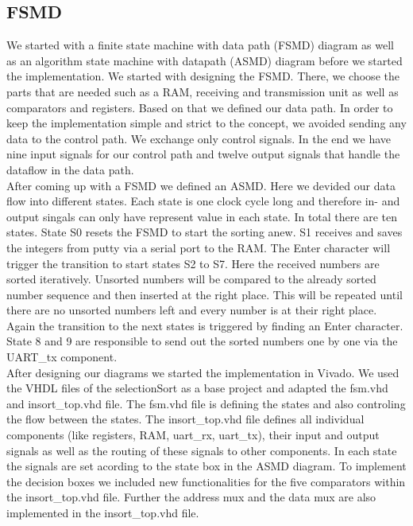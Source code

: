 \documentclass[conference]{IEEEtran}
\begin{document}
\subsection{FSMD}
We started with a finite state machine with data path (FSMD) diagram as well as an algorithm state machine with datapath (ASMD) diagram before we started the implementation. We started with designing the FSMD. There, we choose the parts that are needed such as a RAM, receiving and transmission unit as well as comparators and registers. Based on that we defined our data path. In order to keep the implementation simple and strict to the concept, we avoided sending any data to the control path. We exchange only control signals. In the end we have nine input signals for our control path and twelve output signals that handle the dataflow in the data path.\\
After coming up with a FSMD we defined an ASMD. Here we devided our data flow into different states. Each state is one clock cycle long and therefore in- and output singals can only have represent value in each state. In total there are ten states. State S0 resets the FSMD to start the sorting anew. S1 receives and saves the integers from putty via a serial port to the RAM. The Enter character will trigger the transition to start states S2 to S7. Here the received numbers are sorted iteratively. Unsorted numbers will be compared to the already sorted number sequence and then inserted at the right place. This will be repeated until there are no unsorted numbers left and every number is at their right place. Again the transition to the next states is triggered by finding an Enter character. State 8 and 9 are responsible to send out the sorted numbers one by one via the UART\_tx component.\\
After designing our diagrams we started the implementation in Vivado. We used the VHDL files of the selectionSort as a base project and adapted the fsm.vhd and insort\_top.vhd file. The fsm.vhd file is defining the states and also controling the flow between the states. The insort\_top.vhd file defines all individual components (like registers, RAM, uart\_rx, uart\_tx), their input and output signals as well as the routing of these signals to other components. In each state the signals are set acording to the state box in the ASMD diagram. To implement the decision boxes we included new functionalities for the five comparators within the insort\_top.vhd file. Further the address mux and the data mux are also implemented in the insort\_top.vhd file.\\
\end{document}
